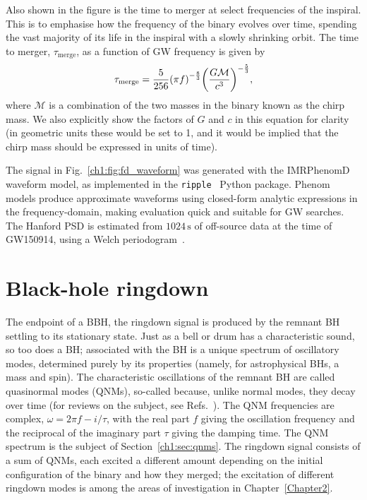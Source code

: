 Also shown in the figure is the time to merger at select frequencies of the inspiral.
This is to emphasise how the frequency of the binary evolves over time, spending the vast majority of its life in the inspiral with a slowly shrinking orbit.
The time to merger, $\tau_\mathrm{merge}$, as a function of GW frequency is given by
\begin{equation}\label{eq:time_to_merger}
    \tau_\mathrm{merge} = \frac{5}{256} \qty(\pi f)^{-\frac{8}{3}} \qty(\frac{G\mathcal{M}}{c^3})^{-\frac{5}{3}},
\end{equation}
where $\mathcal{M}$ is a combination of the two masses in the binary known as the chirp mass.
We also explicitly show the factors of $G$ and $c$ in this equation for clarity (in geometric units these would be set to 1, and it would be implied that the chirp mass should be expressed in units of time). 

The signal in Fig.~\ref{ch1:fig:fd_waveform} was generated with the IMRPhenomD~\cite{Khan:2015jqa} waveform model, as implemented in the \texttt{ripple}~\cite{Edwards:2023sak} Python package.
Phenom models produce approximate waveforms using closed-form analytic expressions in the frequency-domain, making evaluation quick and suitable for GW searches.
The Hanford PSD is estimated from $1024\,\mathrm{s}$ of off-source data at the time of GW150914, using a Welch periodogram~\cite{1161901}.


\section{Black-hole ringdown}

The endpoint of a BBH, the ringdown signal is produced by the remnant BH settling to its stationary state.
Just as a bell or drum has a characteristic sound, so too does a BH; associated with the BH is a unique spectrum of oscillatory modes, determined purely by its properties (namely, for astrophysical BHs, a mass and spin).
The characteristic oscillations of the remnant BH are called quasinormal modes (QNMs), so-called because, unlike normal modes, they decay over time (for reviews on the subject, see Refs.~\cite{Kokkotas:1999bd, Nollert:1999ji, Ferrari:2007dd, Berti:2009kk}).
The QNM frequencies are complex, $\omega = 2\pi f - i/\tau$, with the real part $f$ giving the oscillation frequency and the reciprocal of the imaginary part $\tau$ giving the damping time. 
The QNM spectrum is the subject of Section~\ref{ch1:sec:qnms}.
The ringdown signal consists of a sum of QNMs, each excited a different amount depending on the initial configuration of the binary and how they merged; the excitation of different ringdown modes is among the areas of investigation in Chapter~\ref{Chapter2}.

